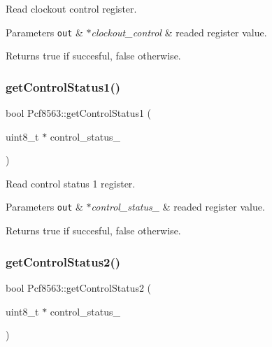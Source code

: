 Read clockout control register. 


\begin{DoxyParams}[1]{Parameters}
\mbox{\tt out}  & {\em $\ast$clockout\+\_\+control} & readed register value. \\
\hline
\end{DoxyParams}
\begin{DoxyReturn}{Returns}
true if succesful, false otherwise. 
\end{DoxyReturn}
\mbox{\label{namespacePcf8563_a098f161f3396c8ed0c2f11c7193f5b0d}} 
\subsubsection{\texorpdfstring{get\+Control\+Status1()}{getControlStatus1()}}
{\footnotesize\ttfamily bool Pcf8563\+::get\+Control\+Status1 (\begin{DoxyParamCaption}\item[{uint8\+\_\+t $\ast$}]{control\+\_\+status\+\_ }\end{DoxyParamCaption})}



Read control status 1 register. 


\begin{DoxyParams}[1]{Parameters}
\mbox{\tt out}  & {\em $\ast$control\+\_\+status\+\_} & readed register value. \\
\hline
\end{DoxyParams}
\begin{DoxyReturn}{Returns}
true if succesful, false otherwise. 
\end{DoxyReturn}
\mbox{\label{namespacePcf8563_a6cf47400c4e974b9d9a1bf1d1a9e463d}} 
\subsubsection{\texorpdfstring{get\+Control\+Status2()}{getControlStatus2()}}
{\footnotesize\ttfamily bool Pcf8563\+::get\+Control\+Status2 (\begin{DoxyParamCaption}\item[{uint8\+\_\+t $\ast$}]{control\+\_\+status\+\_ }\end{DoxyParamCaption})}



